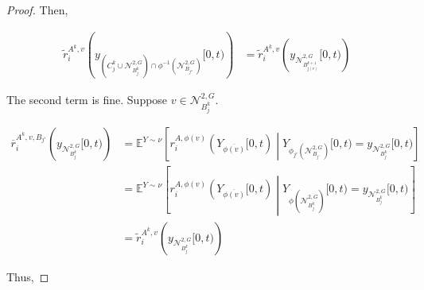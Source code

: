 \documentclass[12pt]{article}
\newcommand{\mb}{\mathbb}
\newcommand{\mc}{\mathcal}
\newcommand{\ov}{\overline}
\newcommand{\exmu}[2]{\mb{E}^{#1}\left[#2\right]}	%
\newcommand{\dgneigh}[2]{\mc{N}^{2,#1}_{#2}}		%
\newcommand{\cl}[1]{\ov{#1}}						%
\newcommand{\indx}[1]{^{#1}}						%
\newcommand{\rate}{r}								%
\newcommand{\xg}{y}									%
\newcommand{\vind}[1]{_{#1}}						%
\newcommand{\tmi}[1]{#1}							%
\newcommand{\stpara}[1]{_{#1}}						%
\newcommand{\gvpara}[2]{^{#1,#2}}					%
\newcommand{\Xg}{Y}									%
\newcommand{\brate}{\alt{\rate}}					%
\newcommand{\alt}[1]{\tilde{#1}}					%
\newcommand{\mm}{\nu}								%
\newcommand{\bgrate}{\ov{\rate}}					%
\newcommand{\gvjpara}[3]{^{#1,#2,#3}}				%
\begin{document}
\begin{proof}
Then, 

\begin{align*}
\brate\gvpara{A\indx{k}}{v}\stpara{i}\left(\xg\vind{\left(C_j\indx{k}\cup\dgneigh{G}{B_j\indx{k}}\right)\cap\phi^{-1}(\dgneigh{G}{B_{j''}})}\tmi{[0,t)}\right) &= \brate\gvpara{A\indx{k}}{v}\stpara{i}\left(\xg\vind{\dgneigh{G}{B_{j(v)}\indx{k+1}}}\tmi{[0,t)}\right)
\end{align*}

The second term is fine. Suppose \(v \in \dgneigh{G}{B_j\indx{k}}\).

\begin{align*}
\bgrate\gvjpara{A\indx{k}}{v}{B_{j'}}\stpara{i}\left(\xg\vind{\dgneigh{G}{B_j\indx{k}}}\tmi{[0,t)}\right) &= \exmu{\Xg\sim\mm}{\rate\gvpara{A}{\phi(v)}\stpara{i}(\Xg\vind{\cl{\phi(v)}}\tmi{[0,t)}\middle|\Xg\vind{\phi_{j'}(\dgneigh{G}{B_{j'}})}\tmi{[0,t)} = \xg\vind{\dgneigh{G}{B_j\indx{k}}}\tmi{[0,t)}}\\
&= \exmu{\Xg\sim\mm}{\rate\gvpara{A}{\phi(v)}\stpara{i}(\Xg\vind{\cl{\phi(v)}}\tmi{[0,t)}\middle|\Xg\vind{\phi(\dgneigh{G}{B_j\indx{k}})}\tmi{[0,t)} = \xg\vind{\dgneigh{G}{B_j\indx{k}}}\tmi{[0,t)}}\\
&= \brate\gvpara{A\indx{k}}{v}\stpara{i}\left(\xg\vind{\dgneigh{G}{B_j\indx{k}}}\tmi{[0,t)}\right)
\end{align*}

Thus,


\end{proof}
\end{document}
